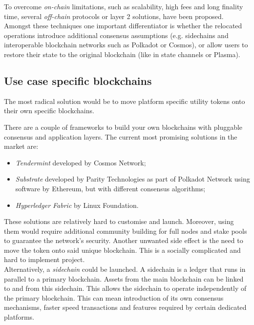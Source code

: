 \documentclass[a4paper,12pt]{article}
\begin{document}
To overcome \textit{on-chain} limitations, such as scalability, high fees and 
long finality time, several \textit{off-chain} protocols or layer 2 solutions, 
have been proposed. Amongst these techniques one important differentiator is 
whether the relocated operations introduce additional consensus assumptions 
(e.g. sidechains and interoperable blockchain networks such as Polkadot or 
Cosmos), or allow users to restore their state to the original blockchain (like 
in state channels or Plasma).

\subsection{Use case specific blockchains}

The most radical solution would be to move platform specific utility tokens 
onto their own specific blockchains.

There are a couple of frameworks to build your own blockchains with pluggable 
consensus and application layers. The current most promising solutions in the 
market are:

\begin{itemize}
    \item \textit{Tendermint} developed by Cosmos Network;
    \item \textit{Substrate} developed by Parity Technologies as part of Polkadot
    Network using software by Ethereum, but with different consensus algorithms;
    \item \textit{Hyperledger Fabric} by Linux Foundation.
\end{itemize}

These solutions are relatively hard to customise and launch. Moreover, using them 
would require additional community building for full nodes and stake pools to 
guarantee the network’s security. Another unwanted side effect is the need to move 
the token onto said unique blockchain. This is a socially complicated and hard to 
implement project. \\

Alternatively, a \textit{sidechain} could be launched. A sidechain is a ledger 
that runs in parallel to a primary blockchain. Assets from the main blockchain can
be linked to and from this sidechain. This allows the sidechain to operate 
independently of the primary blockchain. This can mean introduction of its own 
consensus mechanisms, faster speed transactions and features required by certain 
dedicated platforms.
\end{document}
